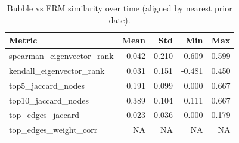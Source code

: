 \begin{table}[ht]
\centering
\small
\begin{tabular}{l r r r r}
\hline
Metric & Mean & Std & Min & Max \\
\hline
spearman\_eigenvector\_rank & 0.042 & 0.210 & -0.609 & 0.599 \\
kendall\_eigenvector\_rank & 0.031 & 0.151 & -0.481 & 0.450 \\
top5\_jaccard\_nodes & 0.191 & 0.099 & 0.000 & 0.667 \\
top10\_jaccard\_nodes & 0.389 & 0.104 & 0.111 & 0.667 \\
top\_edges\_jaccard & 0.023 & 0.036 & 0.000 & 0.179 \\
top\_edges\_weight\_corr & NA & NA & NA & NA \\
\hline
\end{tabular}
\caption{Bubble vs FRM similarity over time (aligned by nearest prior date).}
\label{tab:bubble_vs_frm_similarity}
\end{table}
